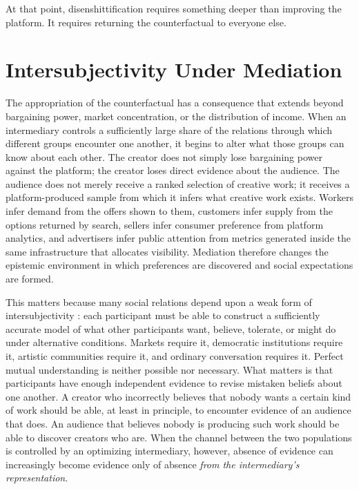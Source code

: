 \documentclass[11pt]{article}
\begin{document}
At that point, disenshittification requires something deeper than improving the platform. It requires returning the counterfactual to everyone else.

\section{Intersubjectivity Under Mediation}

The appropriation of the counterfactual has a consequence that extends beyond bargaining power, market concentration, or the distribution of income. When an intermediary controls a sufficiently large share of the relations through which different groups encounter one another, it begins to alter what those groups can know about each other. The creator does not simply lose bargaining power against the platform; the creator loses direct evidence about the audience. The audience does not merely receive a ranked selection of creative work; it receives a platform-produced sample from which it infers what creative work exists. Workers infer demand from the offers shown to them, customers infer supply from the options returned by search, sellers infer consumer preference from platform analytics, and advertisers infer public attention from metrics generated inside the same infrastructure that allocates visibility. Mediation therefore changes the epistemic environment in which preferences are discovered and social expectations are formed.

This matters because many social relations depend upon a weak form of intersubjectivity \citep{pachniewski2023intersubjectivity}: each participant must be able to construct a sufficiently accurate model of what other participants want, believe, tolerate, or might do under alternative conditions. Markets require it, democratic institutions require it, artistic communities require it, and ordinary conversation requires it. Perfect mutual understanding is neither possible nor necessary. What matters is that participants have enough independent evidence to revise mistaken beliefs about one another. A creator who incorrectly believes that nobody wants a certain kind of work should be able, at least in principle, to encounter evidence of an audience that does. An audience that believes nobody is producing such work should be able to discover creators who are. When the channel between the two populations is controlled by an optimizing intermediary, however, absence of evidence can increasingly become evidence only of absence \emph{from the intermediary's representation}.
\end{document}
